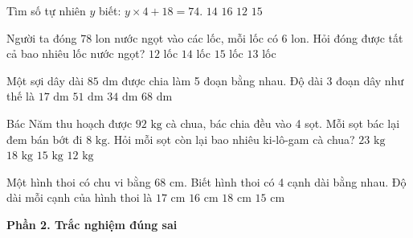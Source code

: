 \begin{ex} %
Tìm số tự nhiên $y$ biết: $y \times 4 + 18 = 74$.
\choice
{\True $14$}
{$16$}
{$12$}
{$15$}
\end{ex}

\begin{ex} %
Người ta đóng 78 lon nước ngọt vào các lốc, mỗi lốc có 6 lon. Hỏi đóng được tất cả bao nhiêu lốc nước ngọt?
\choice
{$12$ lốc}
{$14$ lốc}
{$15$ lốc}
{\True $13$ lốc}
\end{ex}

\begin{ex} %
Một sợi dây dài $85\text{ dm}$ được chia làm 5 đoạn bằng nhau. Độ dài 3 đoạn dây như thế là
\choice
{$17\text{ dm}$}
{\True $51\text{ dm}$}
{$34\text{ dm}$}
{$68\text{ dm}$}
\end{ex}

\begin{ex} %
Bác Năm thu hoạch được $92\text{ kg}$ cà chua, bác chia đều vào 4 sọt. Mỗi sọt bác lại đem bán bớt đi $8\text{ kg}$. Hỏi mỗi sọt còn lại bao nhiêu ki-lô-gam cà chua?
\choice
{$23\text{ kg}$}
{$18\text{ kg}$}
{\True $15\text{ kg}$}
{$12\text{ kg}$}
\end{ex}

\begin{ex} %
Một hình thoi có chu vi bằng $68\text{ cm}$. Biết hình thoi có 4 cạnh dài bằng nhau. Độ dài mỗi cạnh của hình thoi là
\choice
{\True $17\text{ cm}$}
{$16\text{ cm}$}
{$18\text{ cm}$}
{$15\text{ cm}$}
\end{ex}

\textbf{Phần 2. Trắc nghiệm đúng sai}

